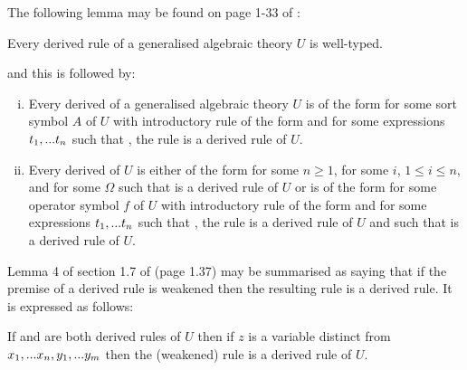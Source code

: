 The following lemma may be found on page 1-33 of \cite{Cartmell78}:
\begin{lemma}
Every derived rule of a generalised algebraic theory $U$ is well-typed.
\end{lemma} 
\noindent and this is followed by:
\begin{lemma}
\begin{enumerate}[(i)]
\item Every derived \Trule of a generalised algebraic theory $U$ is of the form
 for some sort symbol $A$ of $U$ with introductory rule of the form
 and for some expressions $t_1,...t_n$ such that \foreachi, the rule
 is a derived rule of $U$.
\item Every derived \trule of $U$ is 
either of the form  for some $n \ge 1$, for some $i$, $1 \leq i \leq n$, 
and for some $\Omega$ such that  is a derived rule of $U$
or is of the form
 for some operator symbol $f$ of $U$ 
with introductory rule of the form
and for some expressions $t_1,...t_n$ such that \foreachi, the rule
 is a derived rule of $U$
and such that
 is a derived rule of $U$.
\end{enumerate}
\end{lemma}

Lemma 4 of section 1.7 of \cite{Cartmell78} (page 1.37) may be summarised as saying that if the premise of a derived rule is weakened then the resulting rule is a derived rule. It is expressed as follows:
\begin{lemma}
If
  and
 are both derived rules of $U$ then if $z$ is a variable
distinct from $x_1,...x_n,y_1,...y_m$ then
the (weakened) rule  is a derived rule
of $U$.
\end{lemma}

